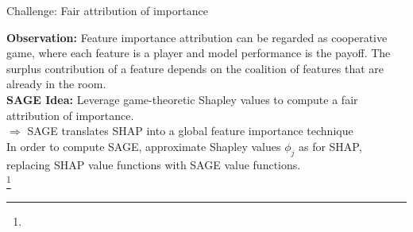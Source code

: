 \documentclass[11pt,compress,t,notes=noshow, xcolor=table]{beamer}
\begin{document}
\begin{vbframe}{Challenge: Fair attribution of importance}

\textbf{Observation:} Feature importance attribution can be regarded as cooperative game, where each feature is a player and model performance is the payoff. The surplus contribution of a feature depends on the coalition of features that are already in the room.\\
\lz
\textbf{SAGE Idea:} Leverage game-theoretic Shapley values to compute a fair attribution of importance.\\
\lz
$\Rightarrow$ SAGE translates SHAP into a global feature importance technique\\
\lz
In order to compute SAGE, approximate Shapley values $\phi_j$ as for SHAP, replacing SHAP value functions with SAGE value functions.\\

\footnote[frame]{}
  
\end{vbframe}
\end{document}
